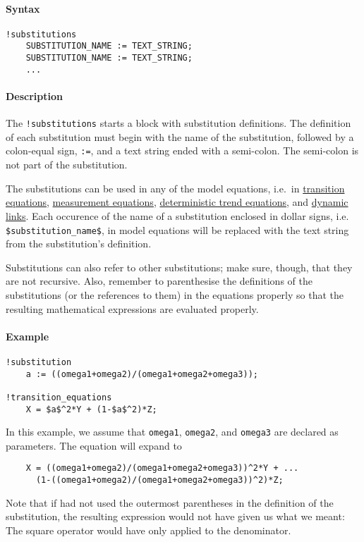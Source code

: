 


	\paragraph{Syntax}

\begin{verbatim}
!substitutions
    SUBSTITUTION_NAME := TEXT_STRING;
    SUBSTITUTION_NAME := TEXT_STRING;
    ...
\end{verbatim}

\paragraph{Description}

The \texttt{!substitutions} starts a block with substitution
definitions. The definition of each substitution must begin with the
name of the substitution, followed by a colon-equal sign, \texttt{:=},
and a text string ended with a semi-colon. The semi-colon is not part of
the substitution.

The substitutions can be used in any of the model equations, i.e.~in
\href{modellang/transitionequations}{transition equations},
\href{modellang/measurementequations}{measurement equations},
\href{modellang/dtrends}{deterministic trend equations}, and
\href{modellang/links}{dynamic links}. Each occurence of the name of a
substitution enclosed in dollar signs, i.e.
\texttt{\$substitution\_name\$}, in model equations will be replaced
with the text string from the substitution's definition.

Substitutions can also refer to other substitutions; make sure, though,
that they are not recursive. Also, remember to parenthesise the
definitions of the substitutions (or the references to them) in the
equations properly so that the resulting mathematical expressions are
evaluated properly.

\paragraph{Example}

\begin{verbatim}
!substitution
    a := ((omega1+omega2)/(omega1+omega2+omega3));

!transition_equations
    X = $a$^2*Y + (1-$a$^2)*Z;
\end{verbatim}

In this example, we assume that \texttt{omega1}, \texttt{omega2}, and
\texttt{omega3} are declared as parameters. The equation will expand to

\begin{verbatim}
    X = ((omega1+omega2)/(omega1+omega2+omega3))^2*Y + ...
      (1-((omega1+omega2)/(omega1+omega2+omega3))^2)*Z;
\end{verbatim}

Note that if had not used the outermost parentheses in the definition of
the substitution, the resulting expression would not have given us what
we meant: The square operator would have only applied to the
denominator.


